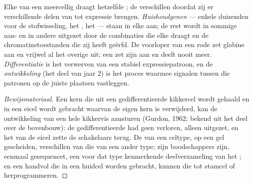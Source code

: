 \begin{proposition}\label{prop:b1:expression-control:differentiation}
Elke  van een meercellig  draagt hetzelfde ; de  verschillen
doordat zij er verschillende delen van tot expressie brengen.
\emph{Huishoudgenen} --- enkele duizenden voor de stofwisseling, het , het
 --- staan in elke  aan; de rest wordt in sommige  aan- en in
andere uitgezet door de combinaties  die elke  draagt en de
chromatinetoestanden die zij heeft geërfd. De voorloper van een rode  zet
globine aan en vrijwel al het overige uit; een  zet zijn  aan en deelt
nooit meer. \emph{Differentiatie} is het verwerven van een stabiel expressiepatroon,
en de \emph{ontwikkeling} (het deel van jaar 2) is het proces waarmee signalen
tussen  die patronen op de juiste plaatsen vastleggen.
\end{proposition}
\begin{proof}[Bewijsmateriaal]
Een kern die uit een gedifferentieerde kikkercel wordt gehaald en in een eicel wordt
gebracht waarvan de eigen kern is verwijderd, kan de ontwikkeling van een hele
kikkervis aansturen (Gurdon, 1962; bekend uit het deel over de bovenbouw): de
gedifferentieerde  had geen  verloren, alleen uitgezet, en het 
van de eicel zette de schakelaars terug. De  van een celtype, op een gel
gescheiden, verschillen van die van een ander type; zijn boodschappers zijn,
eenmaal gesequencet, een voor dat type kenmerkende deelverzameling van het ;
en een handvol  die in een huidcel worden gebracht, kunnen die
tot stamcel of  herprogrammeren.
\end{proof}

